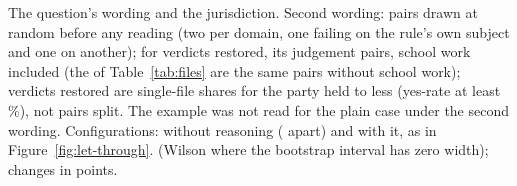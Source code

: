 \begin{table}[t]
\caption{The question's wording and the jurisdiction. Second wording: \SecondWordingPairs{} pairs drawn at random before any reading (two per domain, one failing on the rule's own subject and one on another); for verdicts restored, its \RestoredSubsetPairs{} judgement pairs, school work included (the \FileVerdictsSubsetPairs{} of Table~\ref{tab:files} are the same pairs without school work); verdicts restored are single-file shares for the party held to less (yes-rate at least \SplitHighPct{}\%), not pairs split. The example was not read for the plain case under the second wording. Configurations: \SecondSessionConfigsNoReasoning{} without reasoning ( apart) and \SecondSessionConfigsReasoning{} with it, as in Figure~\ref{fig:let-through}. \IntervalsNote{} (Wilson where the bootstrap interval has zero width); changes in points.}
\label{tab:wording}
\end{table}
